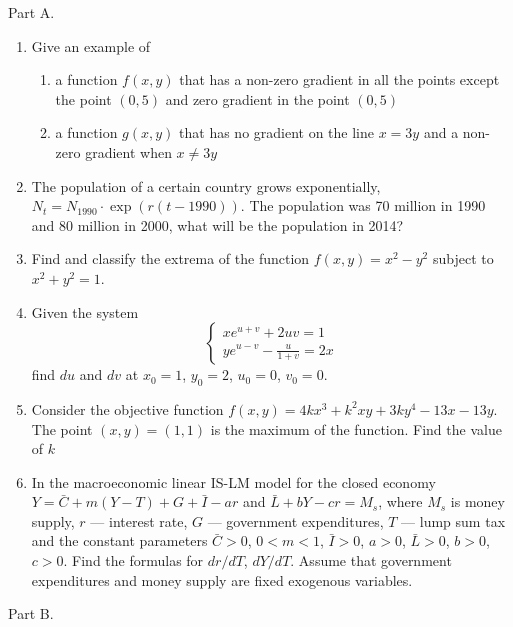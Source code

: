 Part A.

\begin{enumerate}
\item Give an example of
\begin{enumerate}
\item a function $f(x,y)$ that has a non-zero gradient in all the points except the point $(0,5)$ and zero gradient in the point $(0,5)$
\item a function $g(x,y)$ that has no gradient on the line $x=3y$ and a non-zero gradient when $x\neq 3y$
\end{enumerate}

\item The population of a certain country grows exponentially, $N_t= N_{1990}\cdot \exp (r(t-1990))$. The population was 70 million in 1990 and 80 million in 2000,
what will be the population in 2014?

\item Find and classify the extrema of the function $f(x,y)=x^2-y^2$ subject to $x^2+y^2=1$.

\item Given the system
\[
\begin{cases}
xe^{u+v}+2uv=1 \\
ye^{u-v}-\frac{u}{1+v}=2x
\end{cases}
\]
find $du$ and $dv$ at $x_0 = 1$, $y_0 = 2$, $u_0 = 0$, $v_0 = 0$.



\item Consider the objective function $f(x,y)=4kx^3+k^2xy+3ky^4-13x-13y$. The point $(x,y)=(1,1)$ is the maximum of the function. Find the value of $k$

\item In the macroeconomic linear IS-LM model for the closed economy
$Y=\bar{C}+m(Y-T)+G+\bar{I}-ar$ and $\bar{L}+bY-cr=M_s$, where $M_s$ is money supply, $r$ --- interest rate, $G$ --- government expenditures, $T$ --- lump sum tax and the constant parameters $\bar{C}>0$, $0<m<1$, $\bar{I}>0$, $a>0$, $\bar{L}>0$, $b>0$, $c>0$. Find the formulas for $dr/dT$, $dY/dT$. Assume that government expenditures and money supply are fixed exogenous variables.
\end{enumerate}


Part B.

